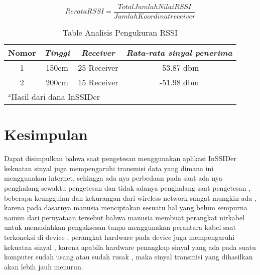 \documentclass[conference]{IEEEtran}
\begin{document}
\begin{equation}
    Rerata RSSI = \frac{Total Jumlah Nilai RSSI}{Jumlah Koordinat receiver}
    \label{rerata_rssi}
\end{equation}

\begin{table}[htbp]
    \caption{Table Analisis Pengukuran RSSI}
    \begin{center}
    \begin{tabular}{|c|c|c|c|}
        \hline
    \textbf{Nomor} & \textbf{\textit{Tinggi}}& \textbf{\textit{Receiver}}& \textbf{\textit{Rata-rata sinyal penerima}} \\
    \hline
    1 & 150cm& 25 Receiver & -53.87 dbm  \\
    \hline
    2 & 200cm& 15 Receiver & -51.98 dbm  \\
    \hline
    \multicolumn{4}{l}{$^{\mathrm{a}}$Hasil dari dana InSSIDer}
    \end{tabular}
    \label{tab2}
    \end{center}
    \end{table}

\section{Kesimpulan}
Dapat disimpulkan bahwa saat pengetesan menggunakan aplikasi InSSIDer kekuatan sinyal juga mempengaruhi transmisi data yang dimana ini menggunakan internet,
sehingga ada nya perbedaan pada saat ada nya penghalang sewaktu pengetesan dan tidak adanya penghalang saat pengetesan , beberapa keunggulan dan kekurangan dari wireless network 
sangat mungkin ada , karena pada dasarnya manusia menciptakan sesuatu hal yang belum sempurna namun dari pernyataan tersebut bahwa manusia membuat perangkat nirkabel untuk memudahkan pengaksesan 
tanpa menggunakan perantara kabel saat terkoneksi di device , perangkat hardware pada device juga mempengaruhi kekuatan sinyal , karena apabila hardware penangkap sinyal yang ada pada suatu komputer sudah usang atau sudah rusak , maka sinyal transmisi yang dihasilkan akan lebih jauh menurun.



\end{document}
